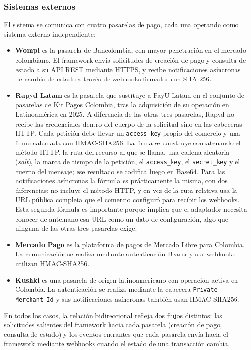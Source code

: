 \subsubsection{Sistemas externos}
El sistema se comunica con cuatro pasarelas de pago, cada una operando como sistema externo independiente:
\begin{itemize}
    \item \textbf{Wompi} es la pasarela de Bancolombia, con mayor penetración en el mercado colombiano. El framework envía solicitudes de creación de pago y consulta de estado a su API REST mediante HTTPS, y recibe notificaciones asíncronas de cambio de estado a través de webhooks firmados con SHA-256.
    \item \textbf{Rapyd Latam} es la pasarela que sustituye a PayU Latam en el conjunto de pasarelas de Kit Pagos Colombia, tras la adquisición de su operación en Latinoamérica en 2025. A diferencia de las otras tres pasarelas, Rapyd no recibe las credenciales dentro del cuerpo de la solicitud sino en las cabeceras HTTP. Cada petición debe llevar un \texttt{access\_key} propio del comercio y una firma calculada con HMAC-SHA256. La firma se construye concatenando el método HTTP, la ruta del recurso al que se llama, una cadena aleatoria (\textit{salt}), la marca de tiempo de la petición, el \texttt{access\_key}, el \texttt{secret\_key} y el cuerpo del mensaje; ese resultado se codifica luego en Base64. Para las notificaciones asíncronas la fórmula es prácticamente la misma, con dos diferencias: no incluye el método HTTP, y en vez de la ruta relativa usa la URL pública completa que el comercio configuró para recibir los webhooks. Esta segunda fórmula es importante porque implica que el adaptador necesita conocer de antemano esa URL como un dato de configuración, algo que ninguna de las otras tres pasarelas exige.
    \item \textbf{Mercado Pago} es la plataforma de pagos de Mercado Libre para Colombia. La comunicación se realiza mediante autenticación Bearer y sus webhooks utilizan HMAC-SHA256.
    \item \textbf{Kushki} es una pasarela de origen latinoamericano con operación activa en Colombia. La autenticación se realiza mediante la cabecera \texttt{Private-Merchant-Id} y sus notificaciones asíncronas también usan HMAC-SHA256.
\end{itemize}
En todos los casos, la relación bidireccional refleja dos flujos distintos: las solicitudes salientes del framework hacia cada pasarela (creación de pago, consulta de estado) y los eventos entrantes que cada pasarela envía hacia el framework mediante webhooks cuando el estado de una transacción cambia.


